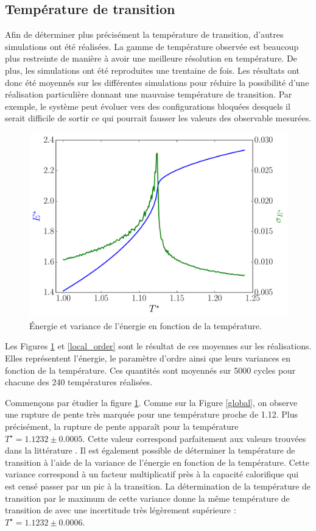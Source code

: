 \documentclass[11pt,a4paper]{article}
\numberwithin{equation}{section}
\begin{document}
\subsection{Température de transition}
\label{temptrans}
Afin de déterminer plus précisément la température de transition, d'autres simulations ont été réalisées. La gamme de température observée est beaucoup plus restreinte de manière à avoir une meilleure résolution en température. De plus, les simulations ont été reproduites une trentaine de fois. Les résultats ont donc été moyennés sur les différentes simulations pour réduire la possibilité d'une réalisation particulière donnant une mauvaise température de transition.  Par exemple, le système peut évoluer vers des configurations bloquées desquels il serait difficile de sortir ce qui pourrait fausser les valeurs des observable mesurées.   

\begin{figure}[h!]
    \centering	    
	\includegraphics[scale=0.6]{figures/local_energie.pdf}
    \caption{Énergie et variance de l'énergie en fonction de la température.}
    	\label{local_energie} 
\end{figure}

Les Figures \ref{local_energie} et \ref{local_order} sont le résultat de ces moyennes sur les réalisations. Elles représentent l'énergie, le paramètre d'ordre ainsi que leurs variances en fonction de la température. Ces quantités sont moyennés sur 5000 cycles pour chacune des 240 températures réalisées.
\medskip

Commençons par étudier la figure \ref{local_energie}. Comme sur la Figure \ref{global}, on observe une rupture de pente très marquée pour une température proche de 1.12. Plus précisément, la rupture de pente apparaît pour la température $T^\star = 1.1232 \pm 0.0005$. Cette valeur correspond parfaitement aux valeurs trouvées dans la littérature \cite{fabbri,wfo, parallel, badass}. Il est également possible de déterminer la température de transition à l'aide de la variance de l'énergie en fonction de la température. Cette variance correspond à un facteur multiplicatif près à la capacité calorifique qui est censé passer par un pic à la transition. La détermination de la température de transition par le maximum de cette variance donne la même température de transition de avec une incertitude très légèrement supérieure : $T^\star = 1.1232 \pm 0.0006$.
\end{document}

